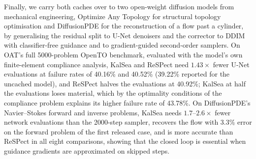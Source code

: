 Finally, we carry both caches over to two open-weight diffusion models from mechanical engineering, Optimize Any Topology for structural topology optimisation and DiffusionPDE for the reconstruction of a flow past a cylinder, by generalising the residual split to U-Net denoisers and the corrector to DDIM with classifier-free guidance and to gradient-guided second-order samplers. On OAT's full 5000-problem OpenTO benchmark, evaluated with the model's own finite-element compliance analysis, KalSea and ReSPect need $1.43\times$ fewer U-Net evaluations at failure rates of 40.16\% and 40.52\% (39.22\% reported for the uncached model), and ReSPect halves the evaluations at 40.92\%; KalSea at half the evaluations loses material, which by the optimality conditions of the compliance problem explains its higher failure rate of 43.78\%. On DiffusionPDE's Navier--Stokes forward and inverse problems, KalSea needs $1.7$--$2.6\times$ fewer network evaluations than the 2000-step sampler, recovers the flow with 3.3\% error on the forward problem of the first released case, and is more accurate than ReSPect in all eight comparisons, showing that the closed loop is essential when guidance gradients are approximated on skipped steps.
